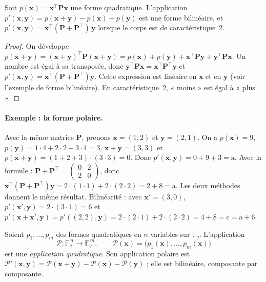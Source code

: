 \begin{proposition}
Soit $p(\mathbf{x})=\mathbf{x}^{\top}\mathbf{P}\mathbf{x}$ une forme quadratique. L'application $p'(\mathbf{x},\mathbf{y})=p(\mathbf{x}+\mathbf{y})-p(\mathbf{x})-p(\mathbf{y})$ est une forme bilinéaire, et $p'(\mathbf{x},\mathbf{y})=\mathbf{x}^{\top}(\mathbf{P}+\mathbf{P}^{\top})\,\mathbf{y}$ lorsque le corps est de caractéristique~2.
\end{proposition}
\begin{proof}
On développe $p(\mathbf{x}+\mathbf{y})=(\mathbf{x}+\mathbf{y})^{\top}\mathbf{P}(\mathbf{x}+\mathbf{y})=p(\mathbf{x})+p(\mathbf{y})+\mathbf{x}^{\top}\mathbf{P}\mathbf{y}+\mathbf{y}^{\top}\mathbf{P}\mathbf{x}$. Un nombre est égal à sa transposée, donc $\mathbf{y}^{\top}\mathbf{P}\mathbf{x}=\mathbf{x}^{\top}\mathbf{P}^{\top}\mathbf{y}$ et $p'(\mathbf{x},\mathbf{y})=\mathbf{x}^{\top}(\mathbf{P}+\mathbf{P}^{\top})\mathbf{y}$. Cette expression est linéaire en $\mathbf{x}$ et en $\mathbf{y}$ (voir l'exemple de forme bilinéaire). En caractéristique~2, « moins » est égal à « plus ».
\end{proof}

\paragraph{Exemple : la forme polaire.} Avec la même matrice $\mathbf{P}$, prenons $\mathbf{x}=(1,2)$ et $\mathbf{y}=(2,1)$. On a $p(\mathbf{x})=9$, $p(\mathbf{y})=1\cdot4+2\cdot2+3\cdot1=3$, $\mathbf{x}+\mathbf{y}=(3,3)$ et $p(\mathbf{x}+\mathbf{y})=(1+2+3)\cdot(3\cdot3)=0$. Donc $p'(\mathbf{x},\mathbf{y})=0+9+3=\mathrm{a}$. Avec la formule : $\mathbf{P}+\mathbf{P}^{\top}=\begin{pmatrix}0&2\\2&0\end{pmatrix}$, donc $\mathbf{x}^{\top}(\mathbf{P}+\mathbf{P}^{\top})\mathbf{y}=2\cdot(1\cdot1)+2\cdot(2\cdot2)=2+8=\mathrm{a}$. Les deux méthodes donnent le même résultat. Bilinéarité : avec $\mathbf{x}'=(3,0)$, $p'(\mathbf{x}',\mathbf{y})=2\cdot(3\cdot1)=6$ et $p'(\mathbf{x}+\mathbf{x}',\mathbf{y})=p'((2,2),\mathbf{y})=2\cdot(2\cdot1)+2\cdot(2\cdot2)=4+8=\mathrm{c}=\mathrm{a}+6$.

\begin{definition}
Soient $p_1,\dots,p_m$ des formes quadratiques en $n$ variables sur $\mathbb{F}_q$. L'application
\[\mathcal{P}:\mathbb{F}_q^{\,n}\longrightarrow\mathbb{F}_q^{\,m},\qquad \mathcal{P}(\mathbf{x})=\bigl(p_1(\mathbf{x}),\dots,p_m(\mathbf{x})\bigr)\]
est une \emph{application quadratique}. Son application polaire est $\mathcal{P}'(\mathbf{x},\mathbf{y})=\mathcal{P}(\mathbf{x}+\mathbf{y})-\mathcal{P}(\mathbf{x})-\mathcal{P}(\mathbf{y})$ ; elle est bilinéaire, composante par composante.
\end{definition}

